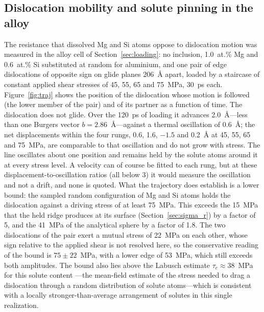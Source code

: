 \subsection{Dislocation mobility and solute pinning in the alloy}
\label{sec:mobility}

The resistance that dissolved Mg and Si atoms oppose to dislocation motion
was measured in the alloy cell of Section~\ref{sec:loading}: no inclusion,
1.0~at.\% Mg and 0.6~at.\% Si substituted at random for aluminium, and one
pair of edge dislocations of opposite sign on glide planes 206~\AA{} apart,
loaded by a staircase of constant applied shear stresses of 45, 55, 65 and
75~MPa, 30~ps each. Figure~\ref{fig:traj} shows the position of the
dislocation whose motion is followed (the lower member of the pair) and of
its partner as a function of time. The dislocation does not glide. Over the
120~ps of loading it advances 2.0~\AA{}---less than one Burgers vector
$b=2.86$~\AA{}---against a thermal oscillation of 0.6~\AA{}; the
net displacements within the four rungs, 0.6, 1.6, $-1.5$ and 0.2~\AA{} at
45, 55, 65 and 75~MPa, are comparable to that oscillation and do not grow
with stress. The line oscillates about one position and remains held by the
solute atoms around it at every stress level. A velocity can of course be
fitted to each rung, but at these displacement-to-oscillation ratios
(all below 3) it would measure the oscillation and not a drift, and none is
quoted. What the trajectory does establish is a lower bound: the sampled
random configuration of Mg and Si atoms holds the dislocation against a
driving stress of at least 75~MPa. This exceeds the 15~MPa that the held ridge produces at its
surface (Section~\ref{sec:sigma_r}) by a factor of 5, and the 41~MPa
of the analytical sphere by a factor of 1.8. The two dislocations of the pair
exert a mutual stress of 22~MPa on each other, whose sign relative to the
applied shear is not resolved here, so the conservative reading of the bound
is $75\pm22$~MPa, with a lower edge of 53~MPa, which still exceeds both
amplitudes.
The bound also lies above the Labusch estimate $\tau_c\approx38$~MPa for
this solute content \cite{Labusch1970,Leyson2010}---the mean-field estimate
of the stress needed to drag a dislocation through a random distribution of
solute atoms---which is consistent with a locally stronger-than-average
arrangement of solutes in this single realization.

